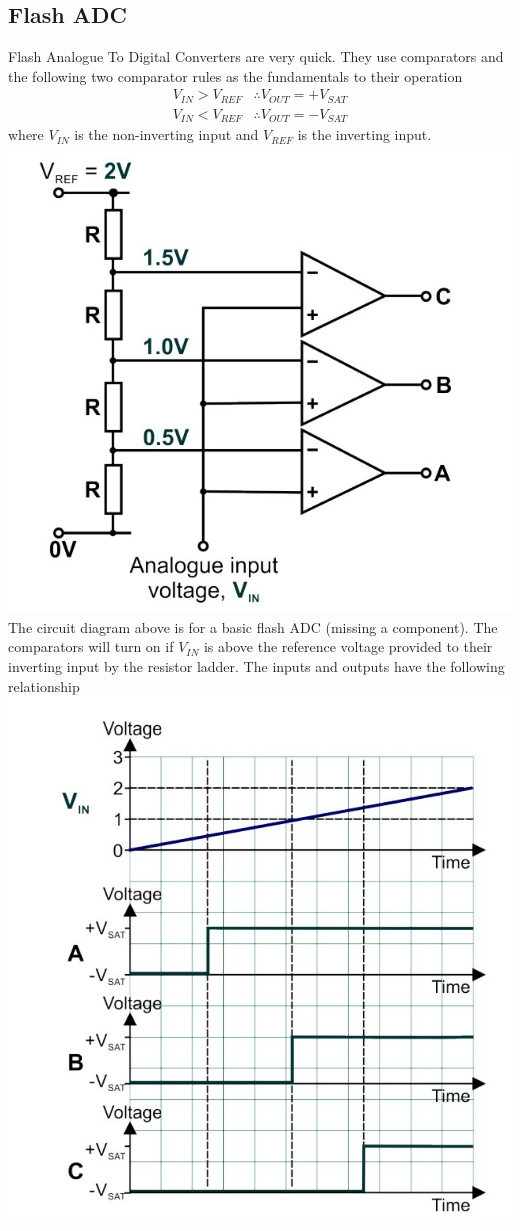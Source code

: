 \documentclass[a4paper,11pt, twocolumn]{article}
\begin{document}
\subsection{Flash ADC}
Flash Analogue To Digital Converters are very quick. They use comparators and the following two comparator rules as the fundamentals to their operation
\begin{align*}
    V_{IN} > V_{REF} & \therefore V_{OUT} = +V_{SAT}\\
    V_{IN} < V_{REF} & \therefore V_{OUT} = -V_{SAT}
\end{align*}
where $V_{IN}$ is the non-inverting input and $V_{REF}$ is the inverting input.
\includegraphics[width=\linewidth]{smolFlash.jpg}
The circuit diagram above is for a basic flash ADC (missing a component). The comparators will turn on if $V_{IN}$ is above the reference voltage provided to their inverting input by the resistor ladder. The inputs and outputs have the following relationship
\includegraphics[width=0.9\linewidth]{smolFlashGraph.jpg}
\end{document}
